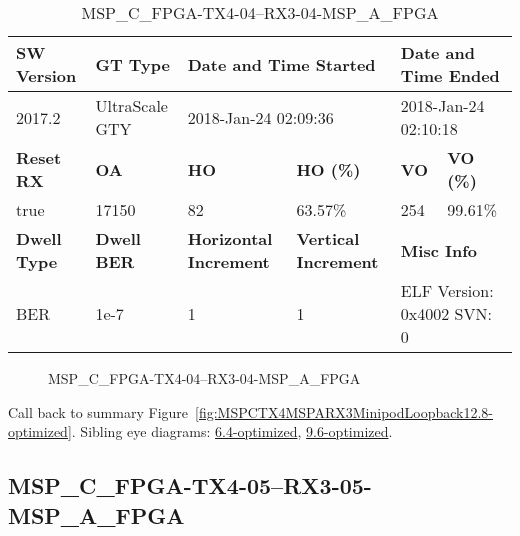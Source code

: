 \begin{table}[h]
\centering
\caption{MSP\_C\_FPGA-TX4-04--RX3-04-MSP\_A\_FPGA}
\label{tab:MSPCFPGATX404RX304MSPAFPGA12.8-optimized}
\begin{tabular}{@{}|l|l|l|l|l|l|@{}}
\toprule
\textbf{SW Version}                & \textbf{GT Type}   & \multicolumn{2}{l|}{\textbf{Date and Time Started}}            & \multicolumn{2}{l|}{\textbf{Date and Time Ended}}        \\ \midrule
2017.2                       & UltraScale GTY          & \multicolumn{2}{l|}{2018-Jan-24 02:09:36}                   & \multicolumn{2}{l|}{2018-Jan-24 02:10:18}               \\ \midrule
\textbf{Reset RX}                  & \textbf{OA} & \textbf{HO}   & \textbf{HO (\%)} & \textbf{VO} & \textbf{VO (\%)} \\ \midrule
true & 17150        & 82          & 63.57\%        & 254        & 99.61\%       \\ \midrule
\textbf{Dwell Type}                & \textbf{Dwell BER} & \textbf{Horizontal Increment} & \textbf{Vertical Increment}    & \multicolumn{2}{l|}{\textbf{Misc Info}}                  \\ \midrule
BER                            & 1e-7        & 1        & 1           & \multicolumn{2}{l|}{ELF Version: 0x4002 SVN: 0}                         \\ \bottomrule
\end{tabular}
\end{table}

\begin{figure}[h]
\caption{MSP\_C\_FPGA-TX4-04--RX3-04-MSP\_A\_FPGA} \label{fig:MSPCFPGATX404RX304MSPAFPGA12.8-optimized}
\end{figure}

Call back to summary Figure~\ref{fig:MSPCTX4MSPARX3MinipodLoopback12.8-optimized}.
Sibling eye diagrams: \hyperref[sec:MSPCFPGATX404RX304MSPAFPGA6.4-optimized]{6.4-optimized}, \hyperref[sec:MSPCFPGATX404RX304MSPAFPGA9.6-optimized]{9.6-optimized}.

\clearpage
\newpage


\subsection{MSP\_C\_FPGA-TX4-05--RX3-05-MSP\_A\_FPGA}\label{sec:MSPCFPGATX405RX305MSPAFPGA12.8-optimized}

